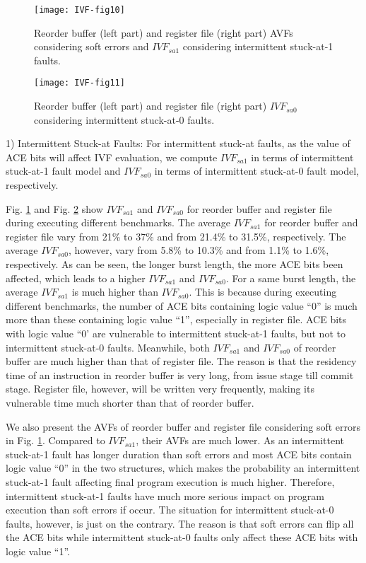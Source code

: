 \begin{figure}[t]
    \centering
    \texttt{[image: IVF-fig10]}\\
    \caption{Reorder buffer (left part) and register file (right part) AVFs considering soft errors and $IVF_{sa1}$ considering intermittent stuck-at-1 faults.}
    \label{fig:AVF-sa1}
\end{figure}

\begin{figure}[t]
    \centering
    \texttt{[image: IVF-fig11]}\\
    \caption{Reorder buffer (left part) and register file (right part) $IVF_{sa0}$ considering intermittent stuck-at-0 faults.}
    \label{fig:AVF-sa0}
\end{figure}


1) Intermittent Stuck-at Faults: For intermittent stuck-at faults, as the value of ACE bits will affect IVF evaluation, we compute $IVF_{sa1}$ in terms of intermittent stuck-at-1 fault model and $IVF_{sa0}$ in terms of intermittent stuck-at-0 fault model, respectively.

Fig. \ref{fig:AVF-sa1} and Fig. \ref{fig:AVF-sa0} show $IVF_{sa1}$ and $IVF_{sa0}$ for reorder buffer and register file during executing different benchmarks. The average $IVF_{sa1}$ for reorder buffer and register file vary from 21\%  to 37\% and from 21.4\% to 31.5\%, respectively. The average $IVF_{sa0}$, however, vary from 5.8\% to 10.3\% and from 1.1\% to 1.6\%, respectively. As can be seen, the longer burst length, the more ACE bits been affected, which leads to a higher $IVF_{sa1}$ and $IVF_{sa0}$. For a same burst length, the average $IVF_{sa1}$ is much higher than $IVF_{sa0}$. This is because during executing different benchmarks, the number of ACE bits containing logic value “0” is much more than these containing logic value “1”, especially in register file. ACE bits with logic value “0’ are vulnerable to intermittent stuck-at-1 faults, but not to intermittent stuck-at-0 faults. Meanwhile, both $IVF_{sa1}$ and $IVF_{sa0}$ of reorder buffer are much higher than that of register file. The reason is that the residency time of an instruction in reorder buffer is very long, from issue stage till commit stage. Register file, however, will be written very frequently, making its vulnerable time much shorter than that of reorder buffer.

We also present the AVFs of reorder buffer and register file considering soft errors in Fig. \ref{fig:AVF-sa1}. Compared to $IVF_{sa1}$, their AVFs are much lower. As an intermittent stuck-at-1 fault has longer duration than soft errors and most ACE bits contain logic value “0” in the two structures, which makes the probability an intermittent stuck-at-1 fault affecting final program execution is much higher. Therefore, intermittent stuck-at-1 faults have much more serious impact on program execution than soft errors if occur. The situation for intermittent stuck-at-0 faults, however, is just on the contrary. The reason is that soft errors can flip all the ACE bits while intermittent stuck-at-0 faults only affect these ACE bits with logic value “1”. 

